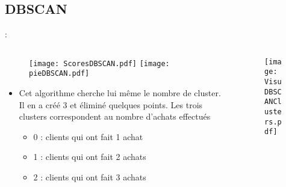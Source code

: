 \documentclass[8pt,aspectratio=169,hyperref={unicode=true}]{beamer}
\begin{document}
\subsection{DBSCAN}
\begin{frame}{\insertsection: \insertsubsection}
    \begin{columns}
        \begin{column}{.55\textwidth}
            \begin{figure}
                \texttt{[image: ScoresDBSCAN.pdf]}
                \texttt{[image: pieDBSCAN.pdf]}
            \end{figure}
            \begin{itemize}
                \item Cet algorithme cherche lui même le nombre de cluster. Il en a créé 3 et éliminé quelques points. Les trois clusters correspondent au nombre d'achats effectués
                      \begin{itemize}
                          \item 0 : clients qui ont fait 1 achat
                          \item 1 : clients qui ont fait 2 achats
                          \item 2 : clients qui ont fait 3 achats
                      \end{itemize}
            \end{itemize}
        \end{column}
        \begin{column}{.45\textwidth}
            \begin{figure}
                \texttt{[image: VisuDBSCANClusters.pdf]}
            \end{figure}
        \end{column}
    \end{columns}
\end{frame}
\end{document}
